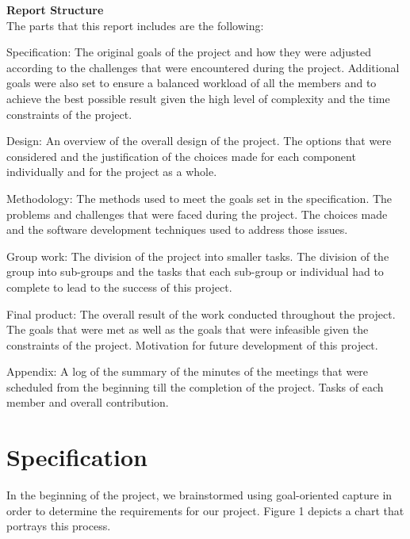 \documentclass[a4paper,11pt]{article}
\begin{document}
\noindent
\textbf{Report Structure}\\
\noindent
The parts that this report includes are the following:


Specification: The original goals of the project and how they were adjusted according to the challenges that were encountered during the project. Additional goals were also set to ensure a balanced workload of all the members and to achieve the best possible result given the high level of complexity and the time constraints of the project.

Design: An overview of the overall design of the project. The options that were considered and the justification of the choices made for each component individually and for the project as a whole.

Methodology: The methods used to meet the goals set in the specification. The problems and challenges that were faced during the project. The choices made and the software development techniques used to address those issues.

Group work: The division of the project into smaller tasks. The division of the group into sub-groups and the tasks that each sub-group or individual had to complete to lead to the success of this project.

Final product: The overall result of the work conducted throughout the project. The goals that were met as well as the goals that were infeasible given the constraints of the project. Motivation for future development of this project.

Appendix: A log of the summary of the minutes of the meetings that were scheduled from the beginning till the completion of the project. Tasks of each member and overall contribution. 

\clearpage
\section{Specification}

In the beginning of the project, we brainstormed using goal-oriented capture in order to determine the requirements for our project. Figure 1 depicts a chart that portrays this process.	
		
\end{document}
